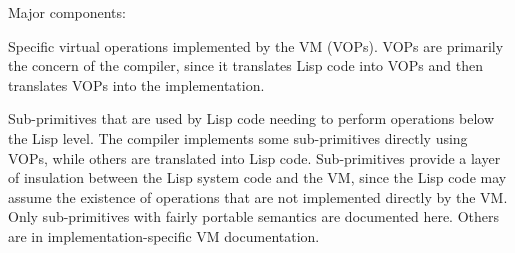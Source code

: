 \begin{comment}
Things the VM won't do:

The VM specification does not totally solve the problem of porting \ccl, since
it is inevitable that it will not map cleanly to all possible combinations of
hardware and operating systems.  The VM should not be regarded as being cast in
concrete, since changes in many characteristics would only affect a tiny
fraction of the system sources.

One current major problem with porting is that large pieces of functionality
are entirely within the VM, and would need to be reimplemented for each port.
A major goal for future work on the system is moving code out of the VM, both
by supporting a ``fast-call'' convention that allows reasonable use of Lisp in
the out of line implementation of VOPs, and by having a ``bugout'' mechanism that
allows the VM to call Lisp functions to implement the hard cases in some VOPs.

The VM is designed to support conventional, untagged, general register
architectures.  Suitably lobotomized, it could be mapped to less flexible
hardware such as ``Lisp machines'', but the compiler would have serious
difficulties supporting stack architectures.

The VM does not support concurrent lightweight processes.  Locking primitives
and deep-binding of specials would be needed.

The VM does not deal with operating systems interface issues at all.  A minimal
port would require implementing at least file and terminal I/O streams.  \ccl
implements system interfaces using Aliens and other facilities built on top of
them.

\end{comment}



Major components:
\begin{itemize}
Specific virtual operations implemented by the VM (VOPs).  VOPs are primarily
the concern of the compiler, since it translates Lisp code into VOPs and then
translates VOPs into the implementation.

Sub-primitives that are used by Lisp code needing to perform operations
below the Lisp level.  The compiler implements some sub-primitives directly
using VOPs, while others are translated into Lisp code.  Sub-primitives provide
a layer of insulation between the Lisp system code and the VM, since the Lisp
code may assume the existence of operations that are not implemented directly
by the VM.  Only sub-primitives with fairly portable semantics are documented
here.  Others are in implementation-specific VM documentation.
\end{itemize}

